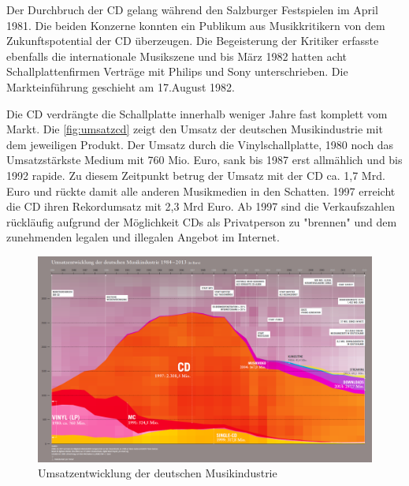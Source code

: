 Der Durchbruch der CD gelang während den Salzburger Festspielen im April 1981.
Die beiden Konzerne konnten ein Publikum aus Musikkritikern von dem
Zukunftspotential der CD überzeugen. Die Begeisterung der Kritiker erfasste
ebenfalls die internationale Musikszene und bis März 1982 hatten acht
Schallplattenfirmen Verträge mit Philips und Sony unterschrieben. Die
Markteinführung geschieht am 17.August 1982. \cite{cuz}

Die CD verdrängte die Schallplatte innerhalb weniger Jahre fast komplett vom
Markt. Die \autoref{fig:umsatzcd} zeigt den Umsatz der deutschen Musikindustrie
mit dem jeweiligen Produkt. Der Umsatz durch die Vinylschallplatte, 1980 noch
das Umsatzstärkste Medium mit 760 Mio. Euro, sank bis 1987 erst allmählich und
bis 1992 rapide. Zu diesem Zeitpunkt betrug der Umsatz mit der CD ca. 1,7 Mrd.
Euro und rückte damit alle anderen Musikmedien in den Schatten. 1997 erreicht
die CD ihren Rekordumsatz mit 2,3 Mrd Euro. Ab 1997 sind die Verkaufszahlen
rückläufig aufgrund der Möglichkeit CDs als Privatperson zu
"brennen" und dem zunehmenden legalen und
illegalen Angebot im Internet.

\begin{figure}[h]
  \begin{center}
      \begin{minipage}[t]{\textwidth}
        \begin{center}
            \includegraphics[width=\textwidth]{Bilder/Optische_Datentraeger_Die_Compact_Disc/Geschichte/umsatzcd.png}
            \caption[Umsatzentwicklung der deutschen Musikindustrie \newline \url{http://www.musikindustrie.de/uploads/media/140325\_BVMI\_2013\_Jahrbuch\_ePaper\_V02.pdf} S. 7 (zuletzt aufgerufen am 03.08.2015)]{Umsatzentwicklung der deutschen Musikindustrie}
            \label{fig:umsatzcd}
        \end{center}
      \end{minipage}
  \end{center}
\end{figure}

